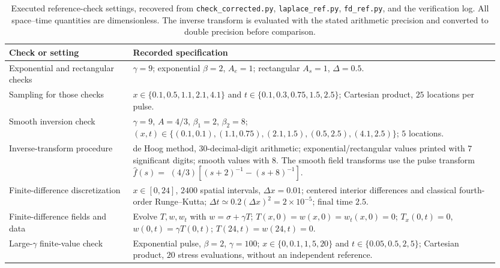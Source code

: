 \documentclass[11pt]{article}
\begin{document}
\begin{table}[htbp]
\centering
\caption{Executed reference-check settings, recovered from
\texttt{check\_corrected.py}, \texttt{laplace\_ref.py}, \texttt{fd\_ref.py}, and the
verification log. All space--time quantities are dimensionless.
The inverse transform is evaluated with the stated arithmetic precision
and converted to double precision before comparison.}
\label{tab:supp-verification-settings}
\begin{tabular}{@{}p{0.24\linewidth}p{0.71\linewidth}@{}}
\toprule
Check or setting & Recorded specification\\
\midrule
Exponential and rectangular checks &
$\gamma=9$; exponential $\beta=2$, $A_e=1$;
rectangular $A_s=1$, $\Delta=0.5$.\\
Sampling for those checks &
$x\in\{0.1,0.5,1.1,2.1,4.1\}$ and
$t\in\{0.1,0.3,0.75,1.5,2.5\}$; Cartesian product,
$25$ locations per pulse.\\
Smooth inversion check &
$\gamma=9$, $A=4/3$, $\beta_1=2$, $\beta_2=8$;
$(x,t)\in\{(0.1,0.1),(1.1,0.75),(2.1,1.5),(0.5,2.5),(4.1,2.5)\}$;
$5$ locations.\\
Inverse-transform procedure &
de Hoog method, $30$-decimal-digit arithmetic;
exponential/rectangular values printed with $7$ significant digits;
smooth values with $8$. The smooth field transforms use the pulse transform $\widehat f(s)=$
$(4/3)[(s+2)^{-1}-(s+8)^{-1}]$.\\
Finite-difference discretization &
$x\in[0,24]$, $2400$ spatial intervals, $\Delta x=0.01$;
centered interior differences and classical fourth-order Runge--Kutta;
$\Delta t\simeq0.2(\Delta x)^2=2\times10^{-5}$;
final time $2.5$.\\
Finite-difference fields and data &
Evolve $T,w,w_t$ with $w=\sigma+\gamma T$;
$T(x,0)=w(x,0)=w_t(x,0)=0$;
$T_x(0,t)=0$, $w(0,t)=\gamma T(0,t)$;
$T(24,t)=w(24,t)=0$.\\
Large-$\gamma$ finite-value check &
Exponential pulse, $\beta=2$, $\gamma=100$;
$x\in\{0,0.1,1,5,20\}$ and
$t\in\{0.05,0.5,2,5\}$; Cartesian product,
$20$ stress evaluations, without an independent reference.\\
\bottomrule
\end{tabular}
\end{table}
\end{document}
